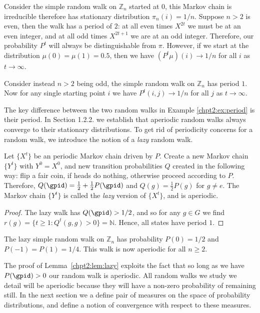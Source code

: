 \documentclass[11pt]{report}
\begin{document}
\begin{example}
	\label{chpt2:ex:period}
	Consider the simple random walk on $\mathbb{Z}_{n}$ started at $0$, this 
	Markov chain is irreducible therefore has stationary distribution 
	$\pi_{n}(i) = 1/n$. Suppose $n>2$ is even, then the walk has a period of 
	$2$: at all even times 	$X^{2t}$ we must be at an even integer, and at all 
	odd times $X^{2t+1}$ we are at an odd integer. Therefore, our probability $P^{t}$ will always be distinguishable from $\pi$. However, if we start at 
	the distribution $\mu(0) = \mu(1) = 0.5$, then we have $ (P^{t} \mu )(i) 
	\to 1/n$ for all $i$ as $t\to \infty$.
	
	Consider instead $n>2$ being odd, the simple random walk on $\mathbb{Z}_{n}$ has period $1$. Now for any single starting point $i$ we have 
	$P^{t}(i,j) \to 1/n$ for all $j$ as $t \to \infty$.
\end{example}

The key difference between the two random walks in Example 
\ref{chpt2:ex:period} is their period.  In Section 1.2.2. we establish that aperiodic random walks  always converge to their stationary distributions.
To get rid of periodicity concerns for a random walk, we introduce the notion of a \emph{lazy} random walk.

\begin{lemma}
	\label{chpt2:lem:lazy}
	Let $\{X^{t}\}$ be an periodic Markov chain driven by $P$. Create a new 
	Markov chain $\{Y^{t}\}$ with $Y^{0} =X^{0}$, and new transition 
	probabilities $Q$ created in the following way: flip a fair coin, if heads 
	do nothing, otherwise proceed according to $P$. Therefore, $Q(\gpid) = 
	\frac{1}{2} + \frac{1}{2}P(\gpid)$ and $Q(g) = \frac{1}{2}P(g)$ for 
	$g\neq e$. The Markov chain $\{Y^{t}\}$ is called the \emph{lazy} version 
	of $\{X^{t}\}$, and is aperiodic.
\end{lemma}

\begin{proof}
	The lazy walk has $Q(\gpid) >1/2 $, and so for any $g\in G$ we find $r(g) = \{t\geq 1 : Q^{t}(g,g)>0\} 
	= \mathbb{N}$. Hence, all states have period $1$.
\end{proof}

\begin{example}
	The lazy simple random walk on $\mathbb{Z}_{n}$ has probability $P(0) =1/2$ 
	and $P(-1)= P(1) =1/4$. This walk is now aperiodic for all $n\geq  2$.
\end{example}


The proof of Lemma~\ref{chpt2:lem:lazy} exploits the fact that so long as we 
have $P(\gpid)>0$ our random walk is aperiodic. All random walks we study we detail will be aperiodic because they will have a non-zero probability of remaining still. In the next 
section we a define pair of measures on the space of probability distributions, and define a notion of convergence with respect to these measures.
\end{document}
